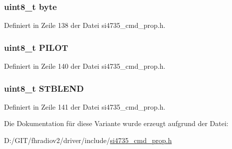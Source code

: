 \subsubsection[{byte}]{\setlength{\rightskip}{0pt plus 5cm}uint8\+\_\+t byte}\label{unionfm__rsq__status__resp3_a96f44d20f1dbf1c8785a7bc99a46164c}


Definiert in Zeile 138 der Datei si4735\+\_\+cmd\+\_\+prop.\+h.

\hypertarget{unionfm__rsq__status__resp3_a4958d1df0f4dc7a3bf46c383663e0739}{}
\subsubsection[{P\+I\+L\+O\+T}]{\setlength{\rightskip}{0pt plus 5cm}uint8\+\_\+t P\+I\+L\+O\+T}\label{unionfm__rsq__status__resp3_a4958d1df0f4dc7a3bf46c383663e0739}


Definiert in Zeile 140 der Datei si4735\+\_\+cmd\+\_\+prop.\+h.

\hypertarget{unionfm__rsq__status__resp3_ad02c06d90cc188a25eba06195f635624}{}
\subsubsection[{S\+T\+B\+L\+E\+N\+D}]{\setlength{\rightskip}{0pt plus 5cm}uint8\+\_\+t S\+T\+B\+L\+E\+N\+D}\label{unionfm__rsq__status__resp3_ad02c06d90cc188a25eba06195f635624}


Definiert in Zeile 141 der Datei si4735\+\_\+cmd\+\_\+prop.\+h.



Die Dokumentation für diese Variante wurde erzeugt aufgrund der Datei\+:\begin{DoxyCompactItemize}
\item 
D\+:/\+G\+I\+T/fhradiov2/driver/include/\hyperlink{si4735__cmd__prop_8h}{si4735\+\_\+cmd\+\_\+prop.\+h}\end{DoxyCompactItemize}
